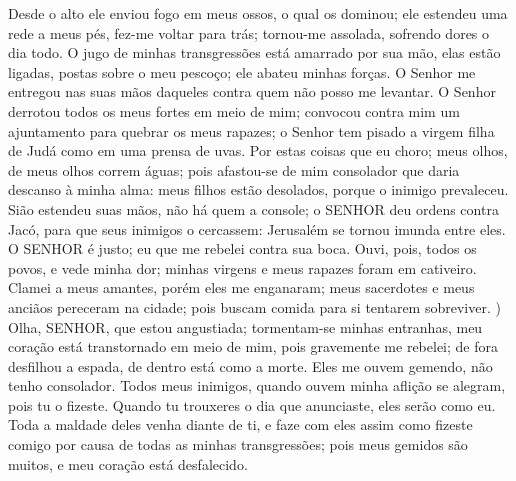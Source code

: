 {  Desde o alto ele enviou fogo em meus ossos, o qual os dominou; ele estendeu uma rede a meus pés, fez-me voltar para trás; tornou-me assolada, sofrendo dores o dia todo.
  O jugo de minhas transgressões está amarrado por sua mão, elas estão ligadas, postas sobre o meu pescoço; ele abateu minhas forças. O Senhor me entregou nas suas mãos daqueles contra quem não posso me levantar.
  O Senhor derrotou todos os meus fortes em meio de mim; convocou contra mim um ajuntamento para quebrar os meus rapazes; o Senhor tem pisado a virgem filha de Judá como
{} em uma prensa de uvas.
  Por estas coisas que eu choro; meus olhos, de meus olhos correm águas; pois afastou-se de mim consolador que daria descanso à minha alma: meus filhos estão desolados, porque o inimigo prevaleceu.
  Sião estendeu suas mãos, não há quem a console; o SENHOR deu ordens contra Jacó, para que seus inimigos o cercassem: Jerusalém se tornou imunda entre eles.
  O SENHOR é justo; eu que me rebelei contra sua boca. Ouvi, pois, todos os povos, e vede minha dor; minhas virgens e meus rapazes foram em cativeiro.
  Clamei a meus amantes, porém eles me enganaram; meus sacerdotes e meus anciãos pereceram na cidade; pois buscam comida para si tentarem sobreviver.
 )
  Olha, SENHOR, que estou angustiada; tormentam-se minhas entranhas, meu coração está transtornado em meio de mim, pois gravemente me rebelei; de fora desfilhou
{} a espada, de dentro está como a morte.
  Eles me ouvem gemendo,
{} não tenho consolador. Todos meus inimigos, quando ouvem minha aflição
 se alegram, pois tu o fizeste. Quando tu trouxeres o dia que anunciaste, eles serão como eu.
  Toda a maldade deles venha diante de ti, e faze com eles assim como fizeste comigo por causa de todas as minhas transgressões; pois meus gemidos são muitos, e meu coração está desfalecido.
\par }

